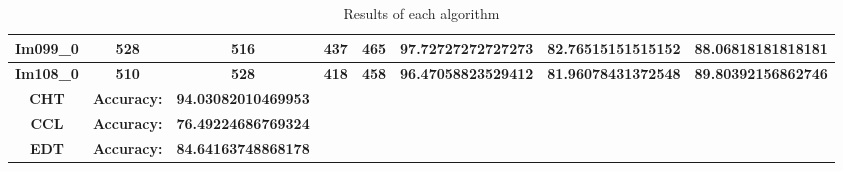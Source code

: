 \begin{table}[H]
\begin{tabular}{|c|c|c|}
 \textbf{Im099\_0} & \textbf{528} & \textbf{516} & \textbf{437} & \textbf{465} & \textbf{97.72727272727273} & \textbf{82.76515151515152} & \textbf{88.06818181818181} \\ \hline
 \textbf{Im108\_0} & \textbf{510} & \textbf{528} & \textbf{418} & \textbf{458} & \textbf{96.47058823529412} & \textbf{81.96078431372548} & \textbf{89.80392156862746} \\ \hline
 \textbf{CHT} & \textbf{Accuracy:} & \textbf{94.03082010469953} \\ \hline
 \textbf{CCL} & \textbf{Accuracy:} & \textbf{76.49224686769324} \\ \hline
 \textbf{EDT} & \textbf{Accuracy:} & \textbf{84.64163748868178} \\ \hline

\end{tabular}
\caption{Results of each algorithm}
\label{Results of each algorithm}
\end{table}
